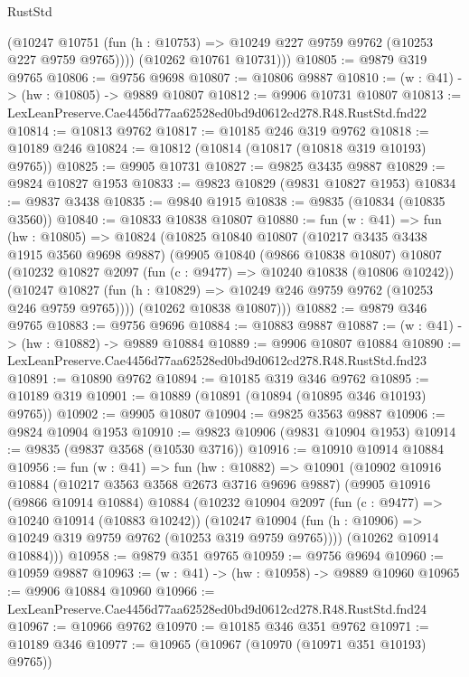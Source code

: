 \begin{lexlean}{RustStd}
\begin{coremodule}
          (@10247 @10751 (fun (h : @10753) => @10249 @227 @9759 @9762 (@10253 @227 @9759 @9765))))
        (@10262 @10761 @10731)))
@10805 := @9879 @319 @9765
@10806 := @9756 @9698
@10807 := @10806 @9887
@10810 := (w : @41) -> (hw : @10805) -> @9889 @10807
@10812 := @9906 @10731 @10807
@10813 := LexLeanPreserve.Cae4456d77aa62528ed0bd9d0612cd278.R48.RustStd.fnd22
@10814 := @10813 @9762
@10817 := @10185 @246 @319 @9762
@10818 := @10189 @246
@10824 := @10812 (@10814 (@10817 (@10818 @319 @10193) @9765))
@10825 := @9905 @10731
@10827 := @9825 @3435 @9887
@10829 := @9824 @10827 @1953
@10833 := @9823 @10829 (@9831 @10827 @1953)
@10834 := @9837 @3438
@10835 := @9840 @1915
@10838 := @9835 (@10834 (@10835 @3560))
@10840 := @10833 @10838 @10807
@10880 := fun (w : @41) =>
  fun (hw : @10805) =>
  @10824
    (@10825
      @10840
      @10807
      (@10217 @3435 @3438 @1915 @3560 @9698 @9887)
      (@9905
        @10840
        (@9866 @10838 @10807)
        @10807
        (@10232
          @10827
          @2097
          (fun (c : @9477) => @10240 @10838 (@10806 @10242))
          (@10247 @10827 (fun (h : @10829) => @10249 @246 @9759 @9762 (@10253 @246 @9759 @9765))))
        (@10262 @10838 @10807)))
@10882 := @9879 @346 @9765
@10883 := @9756 @9696
@10884 := @10883 @9887
@10887 := (w : @41) -> (hw : @10882) -> @9889 @10884
@10889 := @9906 @10807 @10884
@10890 := LexLeanPreserve.Cae4456d77aa62528ed0bd9d0612cd278.R48.RustStd.fnd23
@10891 := @10890 @9762
@10894 := @10185 @319 @346 @9762
@10895 := @10189 @319
@10901 := @10889 (@10891 (@10894 (@10895 @346 @10193) @9765))
@10902 := @9905 @10807
@10904 := @9825 @3563 @9887
@10906 := @9824 @10904 @1953
@10910 := @9823 @10906 (@9831 @10904 @1953)
@10914 := @9835 (@9837 @3568 (@10530 @3716))
@10916 := @10910 @10914 @10884
@10956 := fun (w : @41) =>
  fun (hw : @10882) =>
  @10901
    (@10902
      @10916
      @10884
      (@10217 @3563 @3568 @2673 @3716 @9696 @9887)
      (@9905
        @10916
        (@9866 @10914 @10884)
        @10884
        (@10232
          @10904
          @2097
          (fun (c : @9477) => @10240 @10914 (@10883 @10242))
          (@10247 @10904 (fun (h : @10906) => @10249 @319 @9759 @9762 (@10253 @319 @9759 @9765))))
        (@10262 @10914 @10884)))
@10958 := @9879 @351 @9765
@10959 := @9756 @9694
@10960 := @10959 @9887
@10963 := (w : @41) -> (hw : @10958) -> @9889 @10960
@10965 := @9906 @10884 @10960
@10966 := LexLeanPreserve.Cae4456d77aa62528ed0bd9d0612cd278.R48.RustStd.fnd24
@10967 := @10966 @9762
@10970 := @10185 @346 @351 @9762
@10971 := @10189 @346
@10977 := @10965 (@10967 (@10970 (@10971 @351 @10193) @9765))

\end{coremodule}
\end{lexlean}
